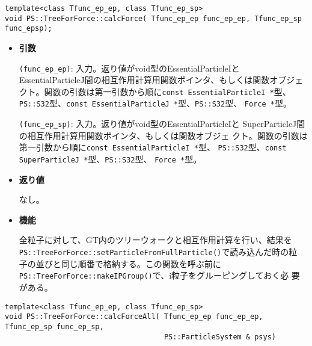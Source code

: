 \begin{screen}
\begin{verbatim}
template<class Tfunc_ep_ep, class Tfunc_ep_sp>
void PS::TreeForForce::calcForce( Tfunc_ep_ep func_ep_ep, Tfunc_ep_sp func_epsp);

\end{verbatim}
\end{screen}

\begin{itemize}

\item{{\bf 引数}}

{\tt (func\_ep\_ep)}: 入力。返り値がvoid型の{EssentialParticleI}と
{EssentialParticleJ}間の相互作用計算用関数ポインタ、もしくは関数オブジェ
クト。関数の引数は第一引数から順に{\tt const EssentialParticleI *}型、
{\tt PS::S32}型、{\tt const EssentialParticleJ *}型、{\tt PS::S32}型、
{\tt Force *}型。

{\tt (func\_ep\_sp)}: 入力。返り値がvoid型の{EssentialParticleI}と
{SuperParticleJ}間の相互作用計算用関数ポインタ、もしくは関数オブジェ
クト。関数の引数は第一引数から順に{\tt const EssentialParticleI *}型、
{\tt PS::S32}型、{\tt const SuperParticleJ *}型、{\tt PS::S32}型、
{\tt Force *}型。

\item{{\bf 返り値}}

なし。

\item{{\bf 機能}}

全粒子に対して、GT内のツリーウォークと相互作用計算を行い、結果を\\
{\tt PS::TreeForForce::setParticleFromFullParticle()}で読み込んだ時の粒
子の並びと同じ順番で格納する。この関数を呼ぶ前に
\verb|PS::TreeForForce::makeIPGroup()|で、i粒子をグルーピングしておく必
要がある。

\end{itemize}

\begin{screen}
\begin{verbatim}
template<class Tfunc_ep_ep, class Tfunc_ep_sp>
void PS::TreeForForce::calcForceAll( Tfunc_ep_ep func_ep_ep,   Tfunc_ep_sp func_ep_sp,  
                                     PS::ParticleSystem & psys) 

\end{verbatim}
\end{screen}

